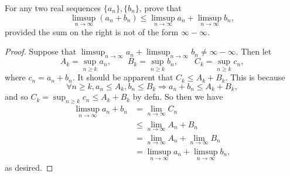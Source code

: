 \documentclass{assignment}
\begin{document}
\begin{question}[5]
  For any two real sequences $\{a_n\}, \{b_n\}$, prove that $$\limsup_{n\to\infty}(a_n + b_n) \leq 
\limsup_{n\to\infty}a_n + \limsup_{n\to\infty}b_n,$$ provided the sum on the right is not of the form
$\infty - \infty$.
\end{question}
\begin{proof}
  Suppose that $\limsup_{n\to\infty}a_n + \limsup_{n\to\infty}b_n \neq \infty - \infty$. Then let
$$A_k = \sup_{n\geq k}a_n, \qquad B_k = \sup_{n\geq k}b_n, \qquad
C_k = \sup_{n\geq k}c_n,$$ where $c_n = a_n + b_n$. It should be apparent that $C_k \leq A_k + B_k$.
This is because $$\forall n\geq k, a_n \leq A_k, b_n \leq B_k \Rightarrow a_n + b_n \leq A_k + B_k,$$
and so $C_k = \sup_{n\geq k} c_n \leq A_k + B_k$ by defn. So then we have
\begin{align*}
  \limsup_{n\to\infty} a_n + b_n &= \lim_{n\to\infty} C_n \\
&\leq \lim_{n\to\infty} A_n + B_n \\
&= \lim_{n\to\infty} A_n + \lim_{n\to\infty} B_n \\
&= \limsup_{n\to\infty} a_n + \limsup_{n\to\infty} b_n,
\end{align*}
as desired.
\end{proof}
\end{document}
